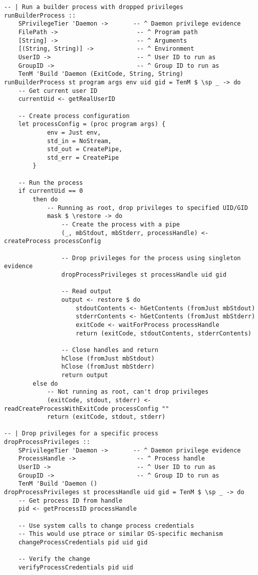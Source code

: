 \documentclass{article}
\begin{document}
\begin{tcolorbox}[title=Ten/Daemon/Core.hs Changes]
\begin{verbatim}
-- | Run a builder process with dropped privileges
runBuilderProcess ::
    SPrivilegeTier 'Daemon ->       -- ^ Daemon privilege evidence
    FilePath ->                      -- ^ Program path
    [String] ->                      -- ^ Arguments
    [(String, String)] ->            -- ^ Environment
    UserID ->                        -- ^ User ID to run as
    GroupID ->                       -- ^ Group ID to run as
    TenM 'Build 'Daemon (ExitCode, String, String)
runBuilderProcess st program args env uid gid = TenM $ \sp _ -> do
    -- Get current user ID
    currentUid <- getRealUserID

    -- Create process configuration
    let processConfig = (proc program args) {
            env = Just env,
            std_in = NoStream,
            std_out = CreatePipe,
            std_err = CreatePipe
        }

    -- Run the process
    if currentUid == 0
        then do
            -- Running as root, drop privileges to specified UID/GID
            mask $ \restore -> do
                -- Create the process with a pipe
                (_, mbStdout, mbStderr, processHandle) <- createProcess processConfig

                -- Drop privileges for the process using singleton evidence
                dropProcessPrivileges st processHandle uid gid

                -- Read output
                output <- restore $ do
                    stdoutContents <- hGetContents (fromJust mbStdout)
                    stderrContents <- hGetContents (fromJust mbStderr)
                    exitCode <- waitForProcess processHandle
                    return (exitCode, stdoutContents, stderrContents)

                -- Close handles and return
                hClose (fromJust mbStdout)
                hClose (fromJust mbStderr)
                return output
        else do
            -- Not running as root, can't drop privileges
            (exitCode, stdout, stderr) <- readCreateProcessWithExitCode processConfig ""
            return (exitCode, stdout, stderr)

-- | Drop privileges for a specific process
dropProcessPrivileges ::
    SPrivilegeTier 'Daemon ->       -- ^ Daemon privilege evidence
    ProcessHandle ->                 -- ^ Process handle
    UserID ->                        -- ^ User ID to run as
    GroupID ->                       -- ^ Group ID to run as
    TenM 'Build 'Daemon ()
dropProcessPrivileges st processHandle uid gid = TenM $ \sp _ -> do
    -- Get process ID from handle
    pid <- getProcessID processHandle

    -- Use system calls to change process credentials
    -- This would use ptrace or similar OS-specific mechanism
    changeProcessCredentials pid uid gid

    -- Verify the change
    verifyProcessCredentials pid uid
\end{verbatim}
\end{tcolorbox}
\end{document}
